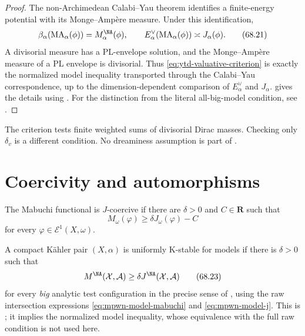 \begin{proof}
The non-Archimedean Calabi--Yau theorem identifies a finite-energy
potential with its Monge--Amp\`ere measure. Under this identification,
\[
      \beta_\alpha(\operatorname{MA}_\alpha(\phi))
             =M_\alpha^{\NA}(\phi),
      \qquad
      E_\alpha^\vee(\operatorname{MA}_\alpha(\phi))
             \asymp J_\alpha(\phi).
\tag{68.21}\label{eq:ytd-beta-mabuchi}
\]
A divisorial measure has a PL-envelope solution, and the
Monge--Amp\`ere measure of a PL envelope is divisorial. Thus
\eqref{eq:ytd-valuative-criterion} is exactly the
normalized model inequality transported through the
Calabi--Yau correspondence, up to the dimension-dependent
comparison of $E_\alpha^\vee$ and $J_\alpha$.
 gives the details using
\cite[Theorems~10.0.1 and~10.0.4]{MPWN25}.
For the distinction from the literal all-big-model condition,
see .
\end{proof}

\begin{remark}
\label{warn:ytd-valuative-measures}
The criterion tests finite weighted sums of divisorial Dirac masses.
Checking only $\delta_v$ is a different condition. No dreaminess
assumption is part of
.
\end{remark}

\section{Coercivity and automorphisms}
\label{sec:ytd-coercivity}

\begin{definition}
\label{def:ytd-coercivity}
The Mabuchi functional is $J$-coercive if there are
$\delta>0$ and $C\in\mathbf R$ such that
\[
                   M_\omega(\varphi)
          \geq\delta J_\omega(\varphi)-C
\tag{68.22}\label{eq:ytd-analytic-coercivity}
\]
for every $\varphi\in\mathcal E^1(X,\omega)$.
\end{definition}

\begin{definition}
\label{def:ytd-model-uniform}
A compact K\"ahler pair $(X,\alpha)$ is uniformly K-stable for
models if there is $\delta>0$ such that
\[
         M^{\NA}(\mathcal X,\mathcal A)
              \geq\delta J^{\NA}(\mathcal X,\mathcal A)
\tag{68.23}\label{eq:ytd-model-uniform}
\]
for every \emph{big} analytic test configuration in the precise sense
of \cite[Definition~1.1.2]{MPWN25}, using the raw intersection
expressions \eqref{eq:mpwn-model-mabuchi} and \eqref{eq:mpwn-model-j}.
This is ; it implies the normalized
model inequality, whose equivalence with the full raw condition
is not used here.
\end{definition}

